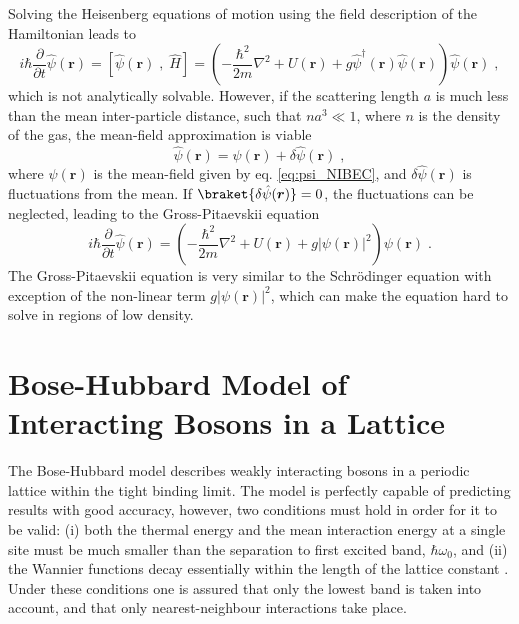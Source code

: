 Solving the Heisenberg equations of motion using the field description of the Hamiltonian leads to
\begin{equation}
	i \hbar \frac{\partial }{\partial t} \hat{\psi}(\boldsymbol{r}) = \left[ \hat{\psi}(\boldsymbol{r}) \; , \; \hat{H}  \right] = \left( - \frac{\hbar^2}{2 m} \nabla^2 + U(\boldsymbol{r}) + g \hat{\psi}^{\dag}(\boldsymbol{r}) \hat{\psi}(\boldsymbol{r}) \right) \hat{\psi}(\boldsymbol{r}) \; ,
\end{equation}
which is not analytically solvable. However, if the scattering length $a$ is much less than the mean inter-particle distance, such that $n a^3 \ll 1$, where $n$ is the density of the gas, the mean-field approximation is viable
\begin{equation}
	\hat{\psi}(\boldsymbol{r}) = \psi(\boldsymbol{r}) + \delta \hat{\psi}(\boldsymbol{r}) \; ,
\end{equation}
where $\psi(\boldsymbol{r})$ is the mean-field given by eq. \eqref{eq:psi_NIBEC}, and $\delta \hat{\psi}(\boldsymbol{r})$ is fluctuations from the mean. If $\braket{\delta \hat{\psi}(\boldsymbol{r})} = 0$, the fluctuations can be neglected, leading to the Gross-Pitaevskii equation \cite{Gross1961,Pitaevskii}
\begin{equation}
	i \hbar \frac{\partial }{\partial t} \hat{\psi}(\boldsymbol{r}) = \left( - \frac{\hbar^2}{2 m} \nabla^2 + U(\boldsymbol{r}) + g |\psi(\boldsymbol{r})|^2 \right) \psi(\boldsymbol{r}) \; .
\end{equation}
The Gross-Pitaevskii equation is very similar to the Schrödinger equation with exception of the non-linear term $g |\psi(\boldsymbol{r})|^2$, which can make the equation hard to solve in regions of low density.



\section{Bose-Hubbard Model of Interacting Bosons in a Lattice} \label{sec:BHmodel}
The Bose-Hubbard model describes weakly interacting bosons in a periodic lattice within the tight binding limit. The model is perfectly capable of predicting results with good accuracy, however, two conditions must hold in order for it to be valid: (i) both the thermal energy and the mean interaction energy at a single site must be much smaller than the separation to first excited band, $\hbar \omega_0$, and (ii) the Wannier functions decay essentially within the length of the lattice constant \cite{manybodyBloch}.
Under these conditions one is assured that only the lowest band is taken into account, and that only nearest-neighbour interactions take place.

